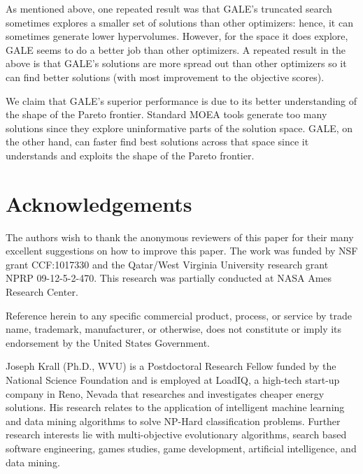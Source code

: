 \documentclass[10pt,journal,compsoc]{IEEEtran}
\begin{document}
 
As mentioned above, one repeated result was
that
GALE's truncated search sometimes explores a
smaller set of solutions than other
optimizers: hence, it can sometimes generate lower hypervolumes.
However, for the space it does explore,
GALE seems to do a better job than other optimizers.
A repeated result in the above is that GALE's solutions are more spread out
than other optimizers so 
 it 
can find better solutions (with most improvement to the objective scores).
 

We claim that GALE's superior performance is due to
its better understanding of the shape of the Pareto
frontier.  Standard MOEA tools generate too many
solutions since they explore uninformative parts of
the solution space.  GALE, on the other hand, can
faster find best solutions across that space since
it understands and exploits the shape of the Pareto
frontier.



\section*{Acknowledgements}
 
The authors wish to thank the anonymous reviewers of this
paper for their many excellent suggestions on how to improve this paper.
The work was funded by NSF grant CCF:1017330 and the
Qatar/West Virginia University research grant NPRP
09-12-5-2-470.  This research was partially
conducted at NASA Ames Research Center. 

Reference
herein to any specific commercial product, process,
or service by trade name, trademark, manufacturer,
or otherwise, does not constitute or imply its endorsement by the United States Government.


    





 
\begin{IEEEbiography}{Joseph Krall}
(Ph.D., WVU)
is a Postdoctoral Research Fellow funded by the National Science Foundation and is employed  at
LoadIQ, a high-tech start-up company in Reno, Nevada that researches and investigates cheaper energy solutions.
His research relates to the application of
intelligent machine learning and data mining algorithms to solve NP-Hard classification problems.
Further research interests lie with multi-objective evolutionary algorithms, 
search based software engineering, games studies, game development, artificial intelligence, and data mining.
\end{IEEEbiography}
\end{document}
